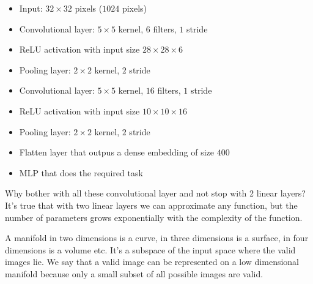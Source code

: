 \begin{itemize}
    \item Input: $32\times32$ pixels ($1024$ pixels)
    \item Convolutional layer: $5\times5$ kernel, $6$ filters, $1$ stride
    \item ReLU activation with input size $28\times28\times6$
    \item Pooling layer: $2\times2$ kernel, $2$ stride
    \item Convolutional layer: $5\times5$ kernel, $16$ filters, $1$ stride
    \item ReLU activation with input size $10\times10\times16$
    \item Pooling layer: $2\times2$ kernel, $2$ stride
    \item Flatten layer that outpus a dense embedding of size $400$
    \item MLP that does the required task
\end{itemize}

Why bother with all these convolutional layer and not stop with 2 linear layers?
It's true that with two linear layers we can approximate any function, but the number of parameters
grows exponentially with the complexity of the function.

A manifold in two dimensions is a curve, in three dimensions is a surface, in four dimensions is a volume etc.
It's a subspace of the input space where the valid images lie.
We say that a valid image can be represented on a low dimensional manifold because only a small subset of all possible images
are valid.



